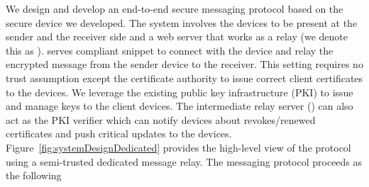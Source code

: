 We design and develop an end-to-end secure messaging protocol based on the secure \usb device we developed. The system involves the \usb devices to be present at the sender and the receiver side and a web server that works as a relay (we denote this as \relay). \relay serves \webusb compliant \js snippet to connect with the \usb device and relay the encrypted message from the sender device to the receiver. This setting requires no trust assumption except the certificate authority to issue correct client certificates to the devices. We leverage the existing public key infrastructure (PKI) to issue and manage keys to the client devices. The intermediate relay server (\relay) can also act as the PKI verifier which can notify devices about revokes/renewed certificates and push critical updates to the devices. Figure~\ref{fig:systemDesignDedicated} provides the high-level view of the protocol using a semi-trusted dedicated message relay. The messaging protocol proceeds as the following


